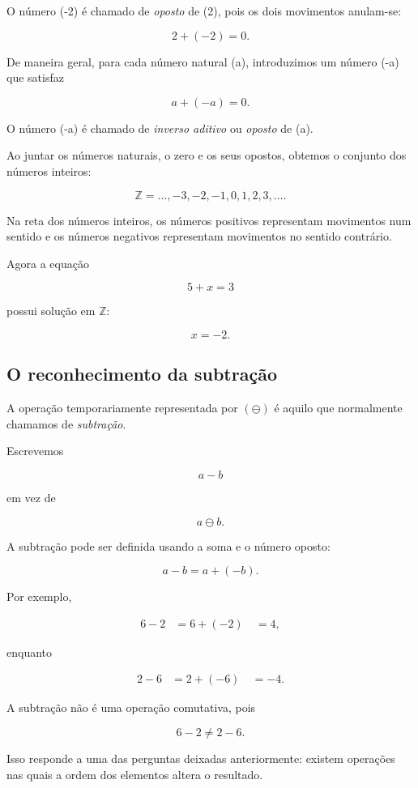 \documentclass[12pt,a4paper]{article}
\begin{document}
O número (-2) é chamado de \emph{oposto} de (2), pois os dois
movimentos anulam-se:

\[
2+(-2)=0.
\]

De maneira geral, para cada número natural (a), introduzimos um número
(-a) que satisfaz

\[
a+(-a)=0.
\]

O número (-a) é chamado de \emph{inverso aditivo} ou \emph{oposto} de
(a).

Ao juntar os números naturais, o zero e os seus opostos, obtemos o
conjunto dos números inteiros:

\[
\mathbb{Z}
=
{\ldots,-3,-2,-1,0,1,2,3,\ldots}.
\]

Na reta dos números inteiros, os números positivos representam
movimentos num sentido e os números negativos representam movimentos
no sentido contrário.

Agora a equação

\[
5+x=3
\]

possui solução em $\mathbb{Z}$:

\[
x=-2.
\]

\subsection{O reconhecimento da subtração}

A operação temporariamente representada por $(\ominus)$ é aquilo que
normalmente chamamos de \emph{subtração}.

Escrevemos

\[
a-b
\]

em vez de

\[
a\ominus b.
\]

A subtração pode ser definida usando a soma e o número oposto:

\[
a-b=a+(-b).
\]

Por exemplo,

\[
\begin{aligned}
6-2
&=6+(-2)\
&=4,
\end{aligned}
\]

enquanto

\[
\begin{aligned}
2-6
&=2+(-6)\
&=-4.
\end{aligned}
\]

A subtração não é uma operação comutativa, pois

\[
6-2\neq2-6.
\]

Isso responde a uma das perguntas deixadas anteriormente: existem
operações nas quais a ordem dos elementos altera o resultado.
\end{document}

